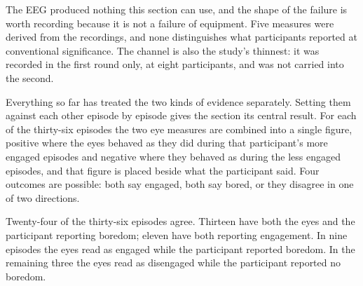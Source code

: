 The EEG produced nothing this section can use, and the shape of the failure is worth recording
because it is not a failure of equipment. Five measures were derived from the recordings, and
none distinguishes what participants reported at conventional significance. The channel is also the study's thinnest: it was recorded in the
first round only, at eight participants, and was not carried into the second.

%

Everything so far has treated the two kinds of evidence separately. Setting them against each
other episode by episode gives the section its central result. For each of the thirty-six
episodes the two eye measures are combined into a single figure, positive where the eyes behaved
as they did during that participant's more engaged episodes and negative where they behaved as
during the less engaged episodes, and that figure is placed beside what the participant said. Four
outcomes are possible: both say engaged, both say bored, or they disagree in one of two
directions.

Twenty-four of the thirty-six episodes agree. Thirteen have both the eyes and the participant
reporting boredom; eleven have both reporting engagement. In nine episodes the eyes read as
engaged while the participant reported boredom. In the remaining three the eyes read as
disengaged while the participant reported no boredom.

